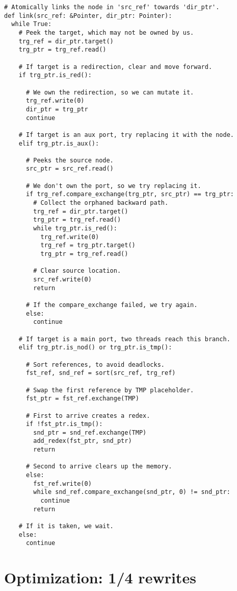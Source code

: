 \documentclass{article}
\begin{document}
\begin{lstlisting}
# Atomically links the node in 'src_ref' towards 'dir_ptr'.
def link(src_ref: &Pointer, dir_ptr: Pointer):
  while True:
    # Peek the target, which may not be owned by us.
    trg_ref = dir_ptr.target()
    trg_ptr = trg_ref.read()

    # If target is a redirection, clear and move forward.
    if trg_ptr.is_red():

      # We own the redirection, so we can mutate it.
      trg_ref.write(0)
      dir_ptr = trg_ptr
      continue

    # If target is an aux port, try replacing it with the node.
    elif trg_ptr.is_aux():

      # Peeks the source node.
      src_ptr = src_ref.read()

      # We don't own the port, so we try replacing it.
      if trg_ref.compare_exchange(trg_ptr, src_ptr) == trg_ptr:
        # Collect the orphaned backward path.
        trg_ref = dir_ptr.target()
        trg_ptr = trg_ref.read()
        while trg_ptr.is_red():
          trg_ref.write(0)
          trg_ref = trg_ptr.target()
          trg_ptr = trg_ref.read()

        # Clear source location.
        src_ref.write(0)
        return

      # If the compare_exchange failed, we try again.
      else:
        continue

    # If target is a main port, two threads reach this branch.
    elif trg_ptr.is_nod() or trg_ptr.is_tmp():

      # Sort references, to avoid deadlocks.
      fst_ref, snd_ref = sort(src_ref, trg_ref)

      # Swap the first reference by TMP placeholder.
      fst_ptr = fst_ref.exchange(TMP)

      # First to arrive creates a redex.
      if !fst_ptr.is_tmp():
        snd_ptr = snd_ref.exchange(TMP)
        add_redex(fst_ptr, snd_ptr)
        return

      # Second to arrive clears up the memory.
      else:
        fst_ref.write(0)
        while snd_ref.compare_exchange(snd_ptr, 0) != snd_ptr:
          continue
        return

    # If it is taken, we wait.
    else:
      continue
\end{lstlisting}

\section{Optimization: 1/4 rewrites}\label{s:lockfree}
\end{document}
